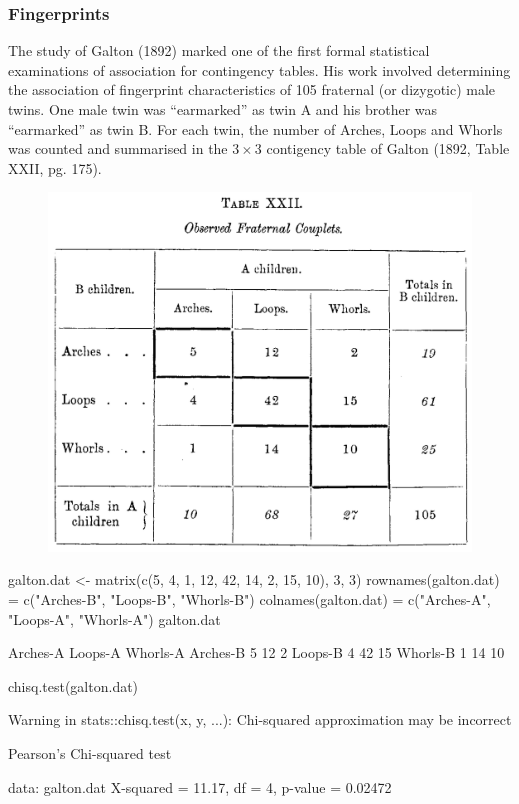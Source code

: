 \documentclass[a4paper]{article}
\begin{document}
\subsubsection{Fingerprints}
The study of Galton (1892) marked one of the first formal statistical examinations of association for contingency tables. His work involved determining the association of fingerprint characteristics of 105 fraternal (or dizygotic) male twins. One male twin was ``earmarked'' as twin A and his brother was ``earmarked'' as twin B. For each twin, the number of Arches, Loops and Whorls was counted and summarised in the \( 3 \times 3 \) contigency table of Galton (1892, Table XXII, pg. 175).
\begin{figure}[H]
	\centering
	\includegraphics[scale=0.5]{fingerprints}
\end{figure}
\begin{Schunk}
\begin{Sinput}
galton.dat <- matrix(c(5, 4, 1, 12, 42, 14, 2, 15, 10), 3, 3)
rownames(galton.dat) = c("Arches-B", "Loops-B", "Whorls-B")
colnames(galton.dat) = c("Arches-A", "Loops-A", "Whorls-A")
galton.dat
\end{Sinput}
\begin{Soutput}
         Arches-A Loops-A Whorls-A
Arches-B        5      12        2
Loops-B         4      42       15
Whorls-B        1      14       10
\end{Soutput}
\begin{Sinput}
chisq.test(galton.dat)
\end{Sinput}
\begin{Soutput}
Warning in stats::chisq.test(x, y, ...): Chi-squared approximation may be incorrect
\end{Soutput}
\begin{Soutput}

	Pearson's Chi-squared test

data:  galton.dat
X-squared = 11.17, df = 4, p-value = 0.02472
\end{Soutput}
\end{Schunk}
\end{document}
